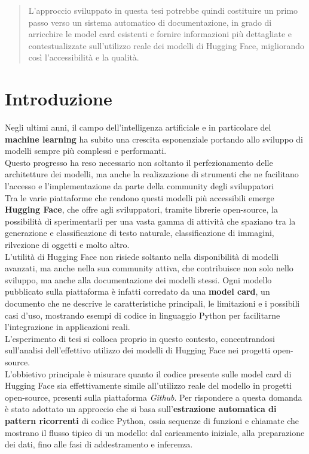 \documentclass{article}
\begin{document}
\begin{abstract}
L’approccio sviluppato in questa tesi potrebbe quindi costituire un primo passo verso un sistema automatico di documentazione, in grado di arricchire le model card esistenti e fornire informazioni più dettagliate e contestualizzate sull’utilizzo reale dei modelli di Hugging Face, migliorando così l’accessibilità e la qualità.

\end{abstract}

\section{Introduzione}
Negli ultimi anni, il campo dell'intelligenza artificiale e in particolare del \textbf{machine learning} ha subito una crescita esponenziale portando allo sviluppo di modelli sempre più complessi e performanti.\\
Questo progresso ha reso necessario non soltanto il perfezionamento delle architetture dei modelli, ma anche la realizzazione di strumenti che ne facilitano l'accesso e l'implementazione da parte della community degli sviluppatori\\
Tra le varie piattaforme che rendono questi modelli più accessibili emerge \textbf{Hugging Face}\cite{huggingface}, che offre agli sviluppatori, tramite librerie open-source, la possibilità di sperimentarli per una vasta gamma di attività che spaziano tra la generazione e classificazione di testo naturale, classificazione di immagini, rilvezione di oggetti e molto altro.\\
L'utilità di Hugging Face non risiede soltanto nella disponibilità di modelli avanzati, ma anche nella sua community attiva, che contribuisce non solo nello sviluppo, ma anche alla documentazione dei modelli stessi. Ogni modello pubblicato sulla piattaforma è infatti corredato da una \textbf{model card}, un documento che ne descrive le caratteristiche principali, le limitazioni e i possibili casi d’uso, mostrando esempi di codice in linguaggio Python per facilitarne l’integrazione in applicazioni reali.\\
L'esperimento di tesi si colloca proprio in questo contesto, concentrandosi sull’analisi dell’effettivo utilizzo dei modelli di Hugging Face nei progetti open-source.\\
L'obbietivo principale è misurare quanto il codice presente sulle model card di Hugging Face sia effettivamente simile all'utilizzo reale del modello in progetti open-source, presenti sulla piattaforma \textit{Github}. Per rispondere a questa domanda è stato adottato un approccio che si basa sull'\textbf{estrazione automatica di pattern ricorrenti} di codice Python, ossia sequenze di funzioni e chiamate che mostrano il flusso tipico di un modello: dal caricamento iniziale, alla preparazione dei dati, fino alle fasi di addestramento e inferenza.\\
\end{document}
